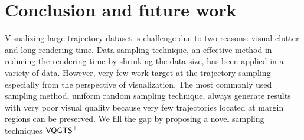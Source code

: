 \section{Conclusion and future work}

Visualizing large trajectory dataset is challenge due to two reasons: visual clutter and long rendering time. 
Data sampling technique, an effective method in reducing the rendering time by shrinking the data size, has been applied in a variety of data. However, very few work target at the trajectory sampling especially from the perspective of visualization. The most commonly used sampling method, uniform random sampling technique, always generate results with very poor visual quality because very few trajectories located at margin regions can be preserved. We fill the gap by proposing a novel sampling techniques $\mathsf{VQGTS}^{+}$